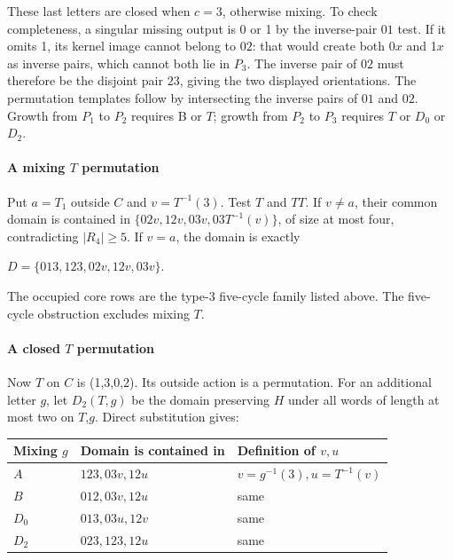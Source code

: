 \documentclass[11pt]{article}
\theoremstyle{definition}
\theoremstyle{plain}
\begin{document}
These last letters are closed when \(c=3\), otherwise mixing. To check
completeness, a singular missing output is 0 or 1 by the
inverse-pair \(01\) test. If it omits 1, its kernel image cannot belong to
\(02\): that would create both 0\(x\) and 1\(x\) as inverse pairs, which
cannot both lie in \(P_{3}\). The inverse pair of \(02\) must therefore be
the disjoint pair \(23\), giving the two displayed orientations. The
permutation templates follow by intersecting the inverse pairs of \(01\) and
\(02\). Growth from \(P_{1}\) to \(P_{2}\) requires B or \(T\); growth from
\(P_{2}\) to \(P_{3}\) requires \(T\) or \(D_{0}\) or \(D_{2}\).

\paragraph{A mixing \(T\)
permutation}\label{a-mixing-t-permutation}

Put \(a=T_{1}\) outside \(C\) and \(v=T^{-1}(3)\). Test \(T\) and \(TT\).
If \(v\ne a\), their common domain is contained in
\(\{02v,12v,03v,03T^{-1}(v)\}\), of size at most four,
contradicting \(|R_{4}|\ge 5\). If \(v=a\), the domain is exactly

\(D=\{013,123,02v,12v,03v\}.\)

The occupied core rows are the type-3 five-cycle family listed above.
The five-cycle obstruction excludes mixing \(T\).

\paragraph{A closed \(T\)
permutation}\label{a-closed-t-permutation}

Now \(T\) on \(C\) is (1,3,0,2). Its outside action is a
permutation. For an additional letter \(g\), let \(D_{2}(T,g)\) be the
domain preserving \(H\) under all words of length at most two on
\(T\),\(g\). Direct substitution gives:

\begin{center}
\begin{tabular}{lll}
\toprule
Mixing \(g\) &  Domain is contained in  & Definition of \(v,u\)\\
\midrule

\(A\) & \(123,03v,12u\) & \(v=g^{-1}(3), u=T^{-1}(v)\)\\
\(B\) & \(012,03v,12u\) & same\\
\(D_{0}\) & \(013,03u,12v\) & same\\
\(D_{2}\) & \(023,123,12u\) & same\\
\bottomrule
\end{tabular}
\end{center}
\end{document}
